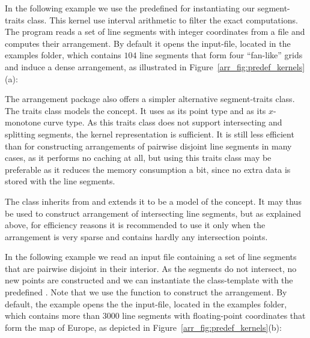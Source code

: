 In the following example we use the predefined
 for instantiating our
segment-traits class. This kernel use interval arithmetic to filter the
exact computations. The program reads a set of line segments with integer
coordinates from a file and computes their arrangement. By default it
opens the  input-file, located in the examples folder,
which contains $104$ line segments that form four ``fan-like'' grids and
induce a dense arrangement, as illustrated in
Figure~\ref{arr_fig:predef_kernels}(a):


The arrangement package also offers a simpler alternative
segment-traits class. The traits class
 models 
the  concept. It uses
 as its point type and
 as its $x$-monotone curve type. As this
traits class does not support intersecting and splitting segments,
the kernel representation is sufficient. It is still less
efficient than  for constructing
arrangements of pairwise disjoint line segments in many cases, as
it performs no caching at all, but using this traits class may be
preferable as it reduces the memory consumption a bit, since no extra
data is stored with the line segments.

The class  inherits
from  and
extends it to be a model of the  concept.
It may thus be used to construct arrangement of intersecting line
segments, but as explained above, for efficiency reasons it is
recommended to use it only when the arrangement is very sparse and
contains hardly any intersection points.

In the following example we read an input file containing a set of
line segments that are pairwise disjoint in their interior. As the
segments do not intersect, no new points are constructed and we can
instantiate the 
class-template with the predefined
. Note that we use
the  function to construct the
arrangement.
By default, the example opens the the  input-file,
located in the examples folder, which contains more than $3000$ line segments
with floating-point coordinates that form the map of Europe, as depicted in
Figure~\ref{arr_fig:predef_kernels}(b):


